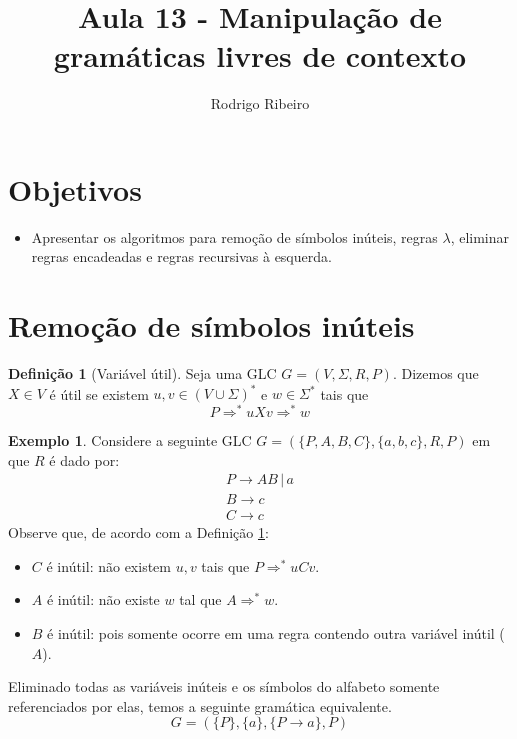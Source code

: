 \documentclass[a4paper]{article}
\theoremstyle{definition}
\newtheorem{Example}{Exemplo}
\newtheorem{Definition}{Definição}
\begin{document}
  \title{Aula 13 - Manipulação de gramáticas livres de contexto}
  \author{Rodrigo Ribeiro}

  \maketitle


  \pagestyle{fancy}


  \section*{Objetivos}

  \begin{itemize}
     \item Apresentar os algoritmos para remoção de símbolos inúteis, regras
       $\lambda$, eliminar regras encadeadas e regras recursivas à esquerda.
  \end{itemize}


  \section{Remoção de símbolos inúteis}

  \begin{Definition}[Variável útil]\label{varutil}
    Seja uma GLC $G=(V,\Sigma,R,P)$. Dizemos que $X \in V$ é útil
    se existem $u,v\in (V\cup\Sigma)^*$ e $w \in \Sigma^*$ tais que
    \[
      P \Rightarrow^* uXv \Rightarrow^* w
    \]
  \end{Definition}
 
  \begin{Example}
    Considere a seguinte GLC $G=(\{P,A,B,C\},\{a,b,c\}, R, P)$ em que
    $R$ é dado por:
    \[
      \begin{array}{l}
        P \to AB\,|\,a\\
        B \to c \\
        C \to c
      \end{array}
    \]
    Observe que, de acordo com a Definição \ref{varutil}:
    \begin{itemize}
      \item $C$ é inútil: não existem $u,v$ tais que $P\Rightarrow^*uCv$.
      \item $A$ é inútil: não existe $w$ tal que $A \Rightarrow^* w$.
      \item $B$ é inútil: pois somente ocorre em uma regra contendo outra
        variável inútil ($A$).
    \end{itemize}
    Eliminado todas as variáveis inúteis e os símbolos do alfabeto somente
    referenciados por elas, temos a seguinte gramática equivalente.
    \[
      G =(\{P\},\{a\},\{P\to a\},P)
    \]
  \end{Example}
\end{document}
